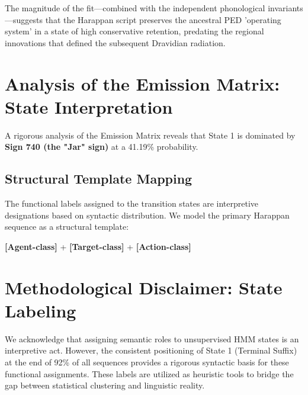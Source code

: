 The magnitude of the fit—combined with the independent phonological invariants—suggests that the Harappan script preserves the ancestral PED 'operating system' in a state of high conservative retention, predating the regional innovations that defined the subsequent Dravidian radiation.

\section{Analysis of the Emission Matrix: State Interpretation}
A rigorous analysis of the Emission Matrix reveals that State 1 is dominated by \textbf{Sign 740 (the "Jar" sign)} at a 41.19\% probability. 

\subsection{Structural Template Mapping}
The functional labels assigned to the transition states are interpretive designations based on syntactic distribution. We model the primary Harappan sequence as a structural template:
\begin{center}
\textbf{[Agent-class]} + \textbf{[Target-class]} + \textbf{[Action-class]}
\end{center}

\section{Methodological Disclaimer: State Labeling}
We acknowledge that assigning semantic roles to unsupervised HMM states is an interpretive act. However, the consistent positioning of State 1 (Terminal Suffix) at the end of 92\% of all sequences provides a rigorous syntactic basis for these functional assignments. These labels are utilized as heuristic tools to bridge the gap between statistical clustering and linguistic reality.

